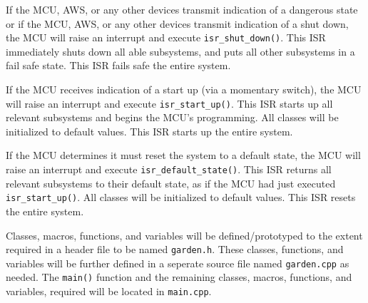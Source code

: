 \begin{flushleft}
    If the MCU, AWS, or any other devices transmit indication of a dangerous
    state or if the MCU, AWS, or any other devices transmit indication of a
    shut down, the MCU will raise an interrupt and execute
    \texttt{isr\_shut\_down()}. This ISR immediately shuts down all able
    subsystems, and puts all other subsystems in a fail safe state. This ISR
    fails safe the entire system.
\end{flushleft}
\begin{flushleft}
    If the MCU receives indication of a start up (via a momentary switch), the
    MCU will raise an interrupt and execute \texttt{isr\_start\_up()}. This ISR
    starts up all relevant subsystems and begins the MCU's programming. All
    classes will be initialized to default values. This ISR starts up the
    entire system.
\end{flushleft}
\begin{flushleft}
    If the MCU determines it must reset the system to a default state, the
    MCU will raise an interrupt and execute \texttt{isr\_default\_state()}.
    This ISR returns all relevant subsystems to their default state,
    as if the MCU had just executed \texttt{isr\_start\_up()}. All classes will
    be initialized to default values. This ISR resets the entire system.
\end{flushleft}
\begin{flushleft}
    Classes, macros, functions, and variables will be defined/prototyped to the
    extent required in a header file to be named \texttt{garden.h}. These
    classes, functions, and variables will be further defined in a seperate
    source file named \texttt{garden.cpp} as needed. The \texttt{main()}
    function and the remaining classes, macros, functions, and variables,
    required will be located in \texttt{main.cpp}.
\end{flushleft}
